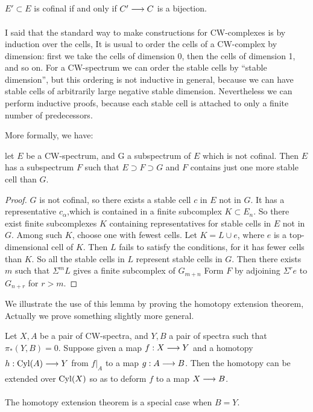 \documentclass[../main]{subfiles}
\begin{document}
\begin{examples}
$E'\subset E$ is cofinal if and only if $C'\lar{} C$ is a bijection.

I said that the standard way to make constructions for CW-complexes is by induction over the cells, It is usual to order the cells of a
CW-complex by dimension: first we take the cells of dimension 0, then
the cells of dimension 1, and so on. For a CW-spectrum we can order
the stable cells by ``stable dimension'', but this ordering is not inductive
 in general, because we can have stable cells of arbitrarily large negative
stable dimension. Nevertheless we can perform inductive proofs, because each stable cell is attached to only a finite number of predecessors.
\end{examples}More formally, we have:
\begin{lemma}\label{lem:p3ch03.1}
let $E$ be a CW-spectrum, and G a subspectrum
of $E$ which is not cofinal. Then $E$ has a subspectrum $F$ such that
$E\supset F\supset G$ and $F$ contains just one more stable cell than $G$. 
\end{lemma}
\begin{proof}
$G$ is not cofinal, so there exists a stable cell $c$ in $E$
not in $G$. It has a representative $c_\alpha$,which is contained in a finite subcomplex $K\subset E_n$. So there exist finite subcomplexes $K$ containing representatives for stable cells in $E$ not in $G$. Among such $K$, choose
one with fewest cells. Let $K=L\cup e$, where $e$ is a top-dimensional
cell of $K$. Then $L$ fails to satisfy the conditions, for it has fewer cells
than $K$. So all the stable cells in $L$ represent stable cells in $G$. Then
there exists $m$ such that $\Sigma^mL$ gives a finite subcomplex of $G_{m+n}$
Form $F$ by adjoining $\Sigma^re$ to $G_{n+r}$ for $r>m$.
\end{proof}
We illustrate the use of this lemma by proving the homotopy extension theorem, Actually we prove something slightly more general. 
\begin{lemma}\label{lem:p3ch03.2}
Let $X,A$ be a pair of CW-spectra, and $Y,B$ a
pair of spectra such that $\pi_\ast(Y,B)= 0$. Suppose given a map $f:X\lar{}Y$
and a homotopy $h: \te{Cyl}(A)\lar{} Y$ from $f|_A$ to a map $g:A\lar{}B$. Then the homotopy can be extended over $\mathrm{Cyl}(X)$ so as to deform $f$ to a map $X\lar{}B$.
\end{lemma}
The homotopy extension theorem is a special case when $B=Y$.
\end{document}
